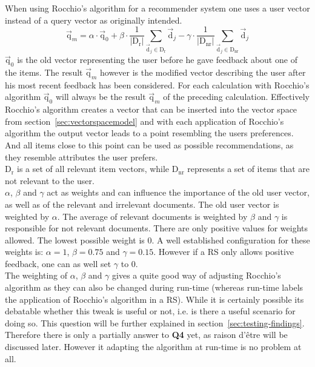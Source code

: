 When using Rocchio's algorithm for a recommender system one uses a user vector instead of a query vector as originally intended.
\begin{equation}
    \vec{\text{q}}_m =
        \alpha \cdot \vec{\text{q}}_0
        + \beta \cdot \frac{1}{|\text{D}_\text{r}|}\sum_{\vec{\text{d}}_j\in \text{D}_\text{r}} \vec{\text{d}}_j
        - \gamma \cdot \frac{1}{|\text{D}_\text{nr}|}\sum_{\vec{\text{d}}_j\in \text{D}_\text{nr}} \vec{\text{d}}_j
\end{equation}
$\vec{\text{q}}_0$ is the old vector representing the user before he gave feedback about one of the items.
The result $\vec{\text{q}}_m$ however is the modified vector describing the user after his most recent feedback has been considered.
For each calculation with Rocchio's algorithm $\vec{\text{q}}_0$ will always be the result $\vec{\text{q}}_m$ of the preceding calculation.
Effectively Rocchio's algorithm creates a vector that can be inserted into the vector space from section~\ref{sec:vectorspacemodel} and with each application of Rocchio's algorithm the output vector leads to a point resembling the users preferences.
And all items close to this point can be used as possible recommendations, as they resemble attributes the user prefers.
\\
$\text{D}_\text{r}$ is a set of all relevant item vectors, while $\text{D}_\text{nr}$ represents a set of items that are not relevant to the user.\\
$\alpha$, $\beta$ and $\gamma$ act as weights and can influence the importance of the old user vector, as well as of  the relevant and irrelevant documents.
The old user vector is weighted by $\alpha$.
The average of relevant documents is weighted by $\beta$ and $\gamma$ is responsible for not relevant documents.
There are only positive values for weights allowed.
The lowest possible weight is 0.
A well established configuration for these weights is: $\alpha = 1$, $\beta = 0.75$ and $\gamma = 0.15$.
However if a RS only allows positive feedback, one can as well set $\gamma$ to 0.
\citep[p.~178-183]{manning:2009}
\\

The weighting of $\alpha$, $\beta$ and $\gamma$ gives a quite good way of adjusting Rocchio's algorithm as they can also be changed during run-time (whereas run-time labels the application of Rocchio's algorithm in a RS).
While it is certainly possible its debatable whether this tweak is useful or not, i.e. is there a useful scenario for doing so.
This question will be further explained in section~\ref{sec:testing-findings}.
Therefore there is only a partially answer to \textbf{Q4} yet, as raison d'\^{e}tre will be discussed later.
However it adapting the algorithm at run-time is no problem at all.

